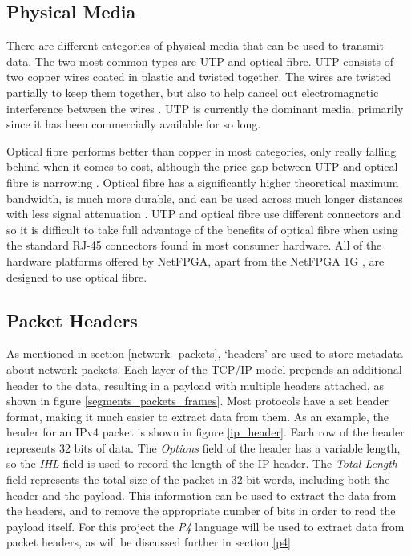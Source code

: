 \newpage

\subsection{Physical Media}
\label{physical_media_research}
There are different categories of physical media that can be used to transmit data. The two most common types are UTP and optical fibre. UTP consists of two copper wires coated in plastic and twisted together. The wires are twisted partially to keep them together, but also to help cancel out electromagnetic interference between the wires \cite{networks03}. UTP is currently the dominant media, primarily since it has been commercially available for so long.

Optical fibre performs better than copper in most categories, only really falling behind when it comes to cost, although the price gap between UTP and optical fibre is narrowing \cite{copper_fibre_universal}. Optical fibre has a significantly higher theoretical maximum bandwidth, is much more durable, and can be used across much longer distances with less signal attenuation \cite{copper_fibre_multicom}. UTP and optical fibre use different connectors and so it is difficult to take full advantage of the benefits of optical fibre when using the standard RJ-45 connectors found in most consumer hardware. All of the hardware platforms offered by NetFPGA, apart from the NetFPGA 1G \cite{NetFPGA_1G}, are designed to use optical fibre. %


\subsection{Packet Headers}
As mentioned in section \ref{network_packets}, `headers' are used to store metadata about network packets.
Each layer of the TCP/IP model prepends an additional header to the data, resulting in a payload with multiple headers attached, as shown in figure \ref{segments_packets_frames}.
Most protocols have a set header format, making it much easier to extract data from them. As an example, the header for an IPv4 packet is shown in figure \ref{ip_header}. Each row of the header represents 32 bits of data.
The \textit{Options} field of the header has a variable length, so the \textit{IHL} field is used to record the length of the IP header.
The \textit{Total Length} field represents the total size of the packet in 32 bit words, including both the header and the payload.
This information can be used to extract the data from the headers, and to remove the appropriate number of bits in order to read the payload itself. For this project the \textit{P4} language \cite{P4} will be used to extract data from packet headers, as will be discussed further in section \ref{p4}.

